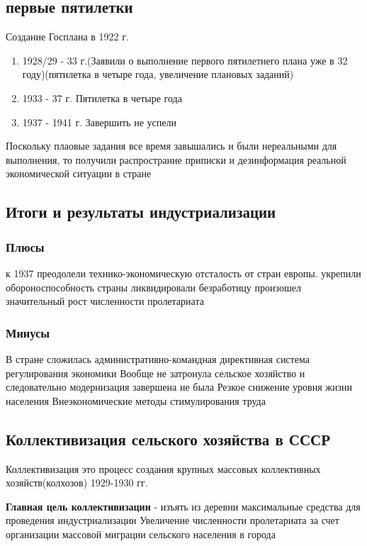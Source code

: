 \documentclass[a4paper]{article}
\begin{document}
\subsection{первые пятилетки}
Создание Госплана в 1922 г.
\begin{enumerate}
    \item 1928/29 - 33 г.(Заявили о выполнение первого пятилетнего плана уже в 32 году)(пятилетка в четыре года, увеличение плановых заданий)
    \item 1933 - 37 г. Пятилетка в четыре года
    \item 1937 - 1941 г. Завершить не успели
\end{enumerate}

Поскольку плаовые задания все время завышались и были нереальными для выполнения, то получили распространие приписки и дезинформация реальной экономической ситуации в стране

\subsection{Итоги и результаты индустриализации}
\subsubsection{Плюсы}
к 1937 преодолели технико-экономическую отсталость от стран европы.
укрепили обороноспособность страны
ликвидировали безработицу
произошел значительный рост численности пролетариата
\subsubsection{Минусы}
В стране сложилась административно-командная директивная система регулирования экономики
Вообще не затронула сельское хозяйство и следовательно модернизация завершена не была
Резкое снижение уровня жизни населения
Внеэкономические методы стимулирования труда

\subsection{Коллективизация сельского хозяйства в СССР}
Коллективизация это процесс создания крупных массовых коллективных хозяйств(колхозов)
1929-1930 гг.

\textbf{Главная цель коллективизации} - изъять из деревни максимальные средства для проведения индустриализации
Увеличение численности пролетариата за счет организации массовой миграции сельского населения в города
\end{document}
